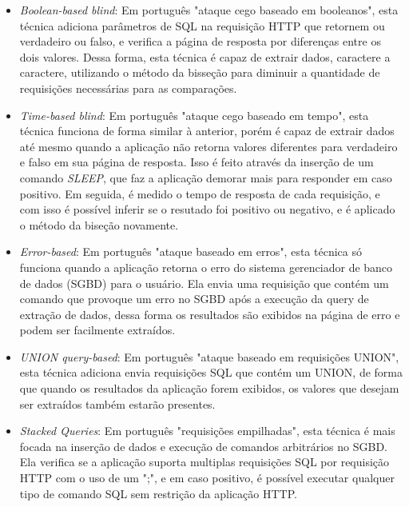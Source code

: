    \label{item:sqlmap}
    \begin{itemize}
        \item \emph{Boolean-based blind}: Em português "ataque cego baseado em booleanos", esta técnica adiciona parâmetros de SQL na requisição HTTP que retornem ou verdadeiro ou falso, e verifica a página de resposta por diferenças entre os dois valores. Dessa forma, esta técnica é capaz de extrair dados, caractere a caractere, utilizando o método da bisseção para diminuir a quantidade de requisições necessárias para as comparações.
        
        \item \emph{Time-based blind}: Em português "ataque cego baseado em tempo", esta técnica funciona de forma similar à anterior, porém é capaz de extrair dados até mesmo quando a aplicação não retorna valores diferentes para verdadeiro e falso em sua página de resposta. Isso é feito através da inserção de um comando \textit{SLEEP}, que faz a aplicação demorar mais para responder em caso positivo. Em seguida, é medido o tempo de resposta de cada requisição, e com isso é possível inferir se o resutado foi positivo ou negativo, e é aplicado o método da biseção novamente.
        
        \item \emph{Error-based}: Em português "ataque baseado em erros", esta técnica só funciona quando a aplicação retorna o erro do sistema gerenciador de banco de dados (SGBD) para o usuário. Ela envia uma requisição que contém um comando que provoque um erro no SGBD após a execução da query de extração de dados, dessa forma os resultados são exibidos na página de erro e podem ser facilmente extraídos.
        
        \item \emph{UNION query-based}: Em português "ataque baseado em requisições UNION", esta técnica adiciona envia requisições SQL que contém um UNION, de forma que quando os resultados da aplicação forem exibidos, os valores que desejam ser extraídos também estarão presentes. 
        
        \item \emph{Stacked Queries}: Em português "requisições empilhadas", esta técnica é mais focada na inserção de dados e execução de comandos arbitrários no SGBD. Ela verifica se a aplicação suporta multiplas requisições SQL por requisição HTTP com o uso de um ";", e em caso positivo, é possível executar qualquer tipo de comando SQL sem restrição da aplicação HTTP.
    \end{itemize}
    
